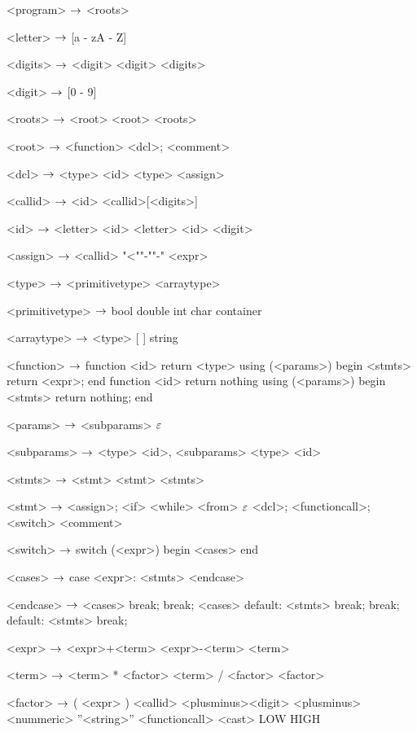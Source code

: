 \begin{grammar}
<program> $\rightarrow$ <roots>

<letter> $\rightarrow$ [a - zA - Z]

<digits> $\rightarrow$ <digit>
\alt <digit> <digits>

<digit> $\rightarrow$ [0 - 9]

<roots> $\rightarrow$ <root>
\alt <root> <roots>

<root> $\rightarrow$ <function>
\alt <dcl>;
\alt <comment>

<dcl> $\rightarrow$ <type> <id>
\alt <type> <assign>

<callid> $\rightarrow$ <id>
\alt <callid>[<digits>]

<id> $\rightarrow$ <letter>
	\alt<id> <letter>
	\alt<id> <digit>

<assign>  $\rightarrow$ <callid> "<""-""-" <expr>

<type> $\rightarrow$ <primitivetype>
\alt <arraytype>

<primitivetype> $\rightarrow$ bool
\alt double
\alt int
\alt char
\alt container

<arraytype> $\rightarrow$ <type> [ ]
\alt string

<function> $\rightarrow$  function <id> return <type> using (<params>)
begin
	<stmts>
	return <expr>;
end
\alt function <id> return nothing using (<params>)
begin
	<stmts>
	return nothing;
end

<params> $\rightarrow$ <subparams>
	\alt $\varepsilon$

<subparams> $\rightarrow$ <type> <id>, <subparams>
\alt <type> <id>

<stmts> $\rightarrow$ <stmt>
	\alt <stmt> <stmts>

<stmt> $\rightarrow$ <assign>;
	\alt <if>
	\alt <while>
	\alt <from>
	\alt $\varepsilon$
	\alt <dcl>;
	\alt <functioncall>;
	\alt <switch>
	\alt <comment>

<switch> $\rightarrow$ switch (<expr>)
		begin
			<cases>
		end

<cases> $\rightarrow$ case <expr>:
			<stmts>
		<endcase>
		
<endcase> $\rightarrow$ <cases>
		\alt break;
		\alt break;
		<cases>
		\alt default:
			<stmts>
			break;
		\alt break;
		default:
			<stmts>
			break;

<expr> $\rightarrow$ <expr>+<term>
	\alt<expr>-<term>
	\alt<term>

<term> $\rightarrow$ <term> * <factor>
	\alt <term> / <factor>
	\alt <factor>

<factor> $\rightarrow$ ( <expr> )
	\alt <callid>
	\alt <plusminus><digit>
	\alt <plusminus><nummeric>
	\alt ''<string>''
	\alt <functioncall> 
	\alt <cast>
	\alt LOW
	\alt HIGH


\end{grammar}
